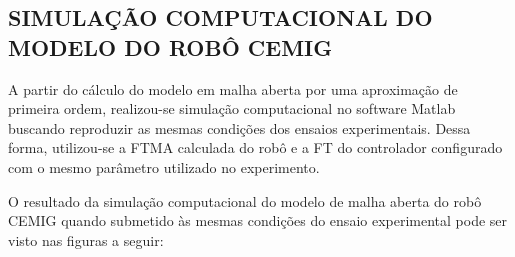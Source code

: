 \documentclass[12pt,oneside,a4paper, chapter=TITLE, section = TITLE, english, brazil]{abntex2}
\begin{document}
\subsection{SIMULAÇÃO COMPUTACIONAL DO MODELO DO ROBÔ CEMIG} %

A partir do cálculo do modelo em malha aberta por uma aproximação de primeira ordem, realizou-se simulação computacional no software Matlab buscando reproduzir as mesmas condições dos ensaios experimentais. Dessa forma, utilizou-se a FTMA calculada do robô e a FT do controlador configurado com o mesmo parâmetro utilizado no experimento.

O resultado da simulação computacional do modelo de malha aberta do robô CEMIG quando submetido às mesmas condições do ensaio experimental pode ser visto nas figuras a seguir:
\\
\\
\end{document}

